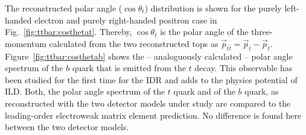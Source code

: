 The reconstructed  polar angle ($\cos{\theta_t}$) distribution is shown for the purely left-handed electron and purely right-handed positron case in Fig.~\ref{fig:ttbar:costhetat}. Thereby, $\cos{\theta_t}$ is the polar angle of the three-momentum calculated from the two reconstructed tops as $\vec{p}_{t\bar{t}} = \vec{p}_t-\vec{p}_{\bar t}$. Figure~\ref{fig:ttbar:costhetab} shows the -- analoguously calculated -- polar angle spectrum of the $b$ quark that is emitted from the $t$ decay. This observable has been studied for the first time for the IDR and adds to the physics potential of ILD.  Both, the polar angle spectrum of the $t$ quark and of the $b$ quark,  as reconstructed with the two detector models under study are compared to the leading-order electroweak matrix element prediction. No difference is found here between the two detector models.
 
